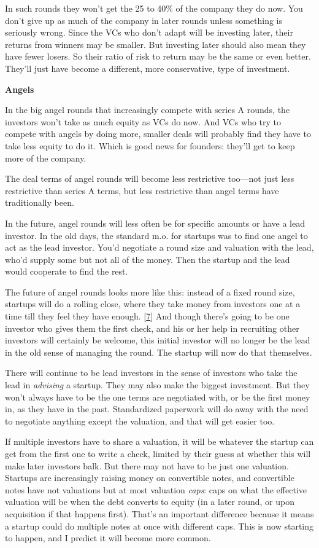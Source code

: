 In such rounds they won't get the 25 to 40\% of the company they do
now.  You don't give up as much of the company in later rounds
unless something is seriously wrong.  Since the VCs who don't adapt
will be investing later, their returns from winners may be smaller.
But investing later should also mean they have fewer losers.  So
their ratio of risk to return may be the same or even better.
They'll just have become a different, more conservative, type of
investment.

\textbf{Angels}

In the big angel rounds that increasingly compete with series A
rounds, the investors won't take as much equity as VCs do now.  And
VCs who try to compete with angels by doing more, smaller deals
will probably find they have to take less equity to do it. Which
is good news for founders: they'll get to keep more of the company.

The deal terms of angel rounds will become less restrictive
too---not just less restrictive than series A terms, but less
restrictive than angel terms have traditionally been.

In the future, angel rounds will less often be for specific amounts
or have a lead investor.  In the old days, the standard m.o. for
startups was to find one angel to act as the lead investor.  You'd
negotiate a round size and valuation with the lead, who'd supply
some but not all of the money.  Then the startup and the lead would
cooperate to find the rest.

The future of angel rounds looks more like this: instead of a fixed
round size, startups will do a rolling close, where they take money
from investors one at a time till they feel they have enough.
[\href{\#f7n}{7}]
And though there's going to be one investor who gives them the first
check, and his or her help in recruiting other investors will
certainly be welcome, this initial investor will no longer be the
lead in the old sense of managing the round.  The startup will now
do that themselves.

There will continue to be lead investors in the sense of investors
who take the lead in \emph{advising} a startup.  They may also make
the biggest investment.  But they won't always have to be the one
terms are negotiated with, or be the first money in, as they have
in the past.  Standardized paperwork will do away with the need to
negotiate anything except the valuation, and that will get easier
too.

If multiple investors have to share a valuation, it will be whatever
the startup can get from the first one to write a check, limited
by their guess at whether this will make later investors balk.  But
there may not have to be just one valuation.  Startups are increasingly
raising money on convertible notes, and convertible notes have not
valuations but at most valuation \emph{caps}: caps on what the
effective valuation will be when the debt converts to equity (in a
later round, or upon acquisition if that happens first).  That's
an important difference because it means a startup could do multiple
notes at once with different caps.  This is now starting to happen,
and I predict it will become more common.

